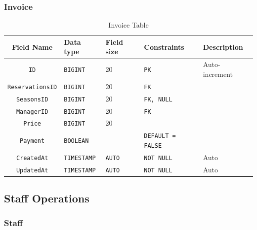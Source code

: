 \subsubsection{Invoice}

\begin{table}[H]
	\centering
	\begin{tabular}{cllll}
		\hline
		Field Name & Data type & Field size & Constraints & Description \\ \hline
		\texttt{ID} & \texttt{BIGINT} & 20 & \texttt{PK} & Auto-increment \\
		\texttt{ReservationsID} & \texttt{BIGINT} & 20 & \texttt{FK} &  \\
		\texttt{SeasonsID} & \texttt{BIGINT} & 20 & \texttt{FK, NULL} & \\
		\texttt{ManagerID} & \texttt{BIGINT} & 20 & \texttt{FK} & \\
		\texttt{Price} & \texttt{BIGINT} & 20 & &  \\
		\texttt{Payment} & \texttt{BOOLEAN} & & \texttt{DEFAULT = FALSE} &  \\
		
		\texttt{CreatedAt} & \texttt{TIMESTAMP} & \texttt{AUTO} & \texttt{NOT NULL} & Auto \\
		\texttt{UpdatedAt} & \texttt{TIMESTAMP} & \texttt{AUTO} & \texttt{NOT NULL} & Auto \\
		\hline
	\end{tabular}
	\caption{Invoice Table}
\end{table}

\subsection{Staff Operations}

\subsubsection{Staff}


